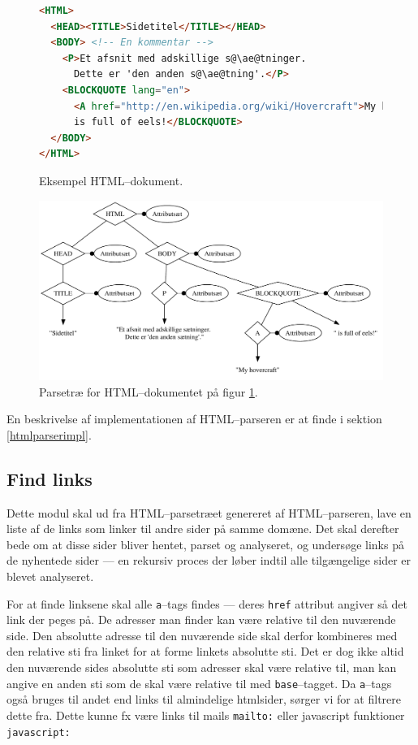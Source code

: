 \documentclass[a4paper,oneside]{memoir}
\begin{document}
\begin{figure}
\begin{lstlisting}[language=HTML,
                   escapechar=\@]
<HTML>
  <HEAD><TITLE>Sidetitel</TITLE></HEAD>
  <BODY> <!-- En kommentar -->
    <P>Et afsnit med adskillige s@\ae@tninger.
      Dette er 'den anden s@\ae@tning'.</P>
    <BLOCKQUOTE lang="en">
      <A href="http://en.wikipedia.org/wiki/Hovercraft">My hovercraft</A>
      is full of eels!</BLOCKQUOTE>
  </BODY>
</HTML>
\end{lstlisting}

  \caption{Eksempel HTML--dokument.}
  \label{htmldoc1}
\end{figure}

\begin{figure}
  \includegraphics[width=\textwidth]{parsetree.pdf}
  \caption{Parsetræ for HTML--dokumentet på figur \ref{htmldoc1}.}
  \label{parsetree}
\end{figure}

En beskrivelse af implementationen af HTML--parseren er at finde i
sektion \ref{htmlparserimpl}.

\subsection{Find links}
Dette modul skal ud fra HTML--parsetræet genereret af HTML--parseren,
lave en liste af de links som linker til andre sider på samme domæne.
Det skal derefter bede om at disse sider bliver hentet, parset og
analyseret, og undersøge links på de nyhentede sider --- en rekursiv
proces der løber indtil alle tilgængelige sider er blevet analyseret.

For at finde linksene skal alle \texttt{a}--tags findes --- deres
\texttt{href} attribut angiver så det link der peges på. De adresser
man finder kan være relative til den nuværende side. Den absolutte
adresse til den nuværende side skal derfor kombineres med den relative
sti fra linket for at forme linkets absolutte sti. Det er dog ikke
altid den nuværende sides absolutte sti som adresser skal være
relative til, man kan angive en anden sti som de skal være relative
til med \texttt{base}--tagget. Da \texttt{a}--tags også bruges til andet 
end links til almindelige htmlsider, sørger vi for at filtrere dette fra. 
Dette kunne fx være links til mails \texttt{mailto:} eller javascript
funktioner \texttt{javascript:}
\end{document}
